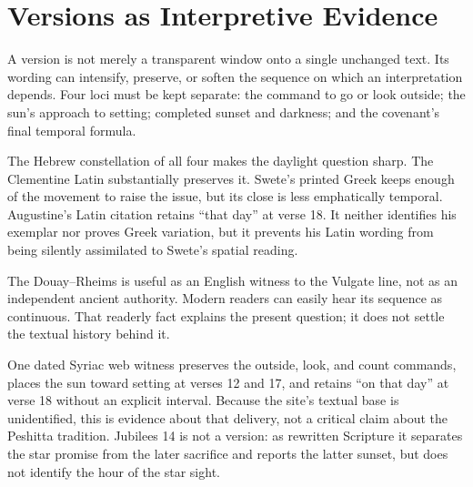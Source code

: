 \section{Versions as Interpretive Evidence}

A version is not merely a transparent window onto a single unchanged text.
Its wording can intensify, preserve, or soften the sequence on which an
interpretation depends. Four loci must be kept separate: the command to go or
look outside; the sun's approach to setting; completed sunset and darkness;
and the covenant's final temporal formula.

The Hebrew constellation of all four makes the daylight question sharp. The
Clementine Latin substantially preserves it. Swete's printed Greek keeps
enough of the movement to raise the issue, but its close is less emphatically
temporal. Augustine's Latin citation retains ``that day'' at verse 18. It
neither identifies his exemplar nor proves Greek variation, but it prevents
his Latin wording from being silently assimilated to Swete's spatial reading.

The Douay--Rheims is useful as an English witness to the Vulgate line, not as
an independent ancient authority. Modern readers can easily hear its sequence
as continuous. That readerly fact explains the present question; it does not
settle the textual history behind it.

One dated Syriac web witness preserves the outside, look, and count commands,
places the sun toward setting at verses 12 and 17, and retains ``on that day''
at verse 18 without an explicit interval. Because the site's textual base is
unidentified, this is evidence about that delivery, not a critical claim about
the Peshitta tradition. Jubilees 14 is not a version: as rewritten Scripture it
separates the star promise from the later sacrifice and reports the latter
sunset, but does not identify the hour of the star sight.


